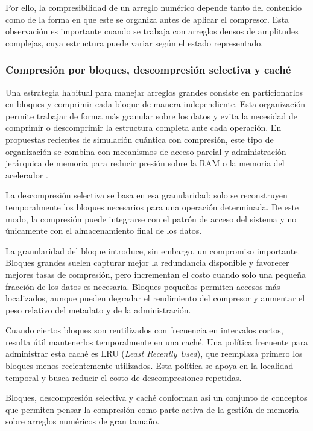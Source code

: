 Por ello, la compresibilidad de un arreglo numérico depende tanto del contenido como de la forma en que este se organiza antes de aplicar el compresor. Esta observación es importante cuando se trabaja con arreglos densos de amplitudes complejas, cuya estructura puede variar según el estado representado.

\subsubsection{Compresión por bloques, descompresión selectiva y caché}

Una estrategia habitual para manejar arreglos grandes consiste en particionarlos en bloques y comprimir cada bloque de manera independiente. Esta organización permite trabajar de forma más granular sobre los datos y evita la necesidad de comprimir o descomprimir la estructura completa ante cada operación. En propuestas recientes de simulación cuántica con compresión, este tipo de organización se combina con mecanismos de acceso parcial y administración jerárquica de memoria para reducir presión sobre la RAM o la memoria del acelerador \cite{wu2019full,zhang2024bmqsim}.

La descompresión selectiva se basa en esa granularidad: solo se reconstruyen temporalmente los bloques necesarios para una operación determinada. De este modo, la compresión puede integrarse con el patrón de acceso del sistema y no únicamente con el almacenamiento final de los datos.

La granularidad del bloque introduce, sin embargo, un compromiso importante. Bloques grandes suelen capturar mejor la redundancia disponible y favorecer mejores tasas de compresión, pero incrementan el costo cuando solo una pequeña fracción de los datos es necesaria. Bloques pequeños permiten accesos más localizados, aunque pueden degradar el rendimiento del compresor y aumentar el peso relativo del metadato y de la administración.

Cuando ciertos bloques son reutilizados con frecuencia en intervalos cortos, resulta útil mantenerlos temporalmente en una caché. Una política frecuente para administrar esta caché es LRU (\emph{Least Recently Used}), que reemplaza primero los bloques menos recientemente utilizados. Esta política se apoya en la localidad temporal y busca reducir el costo de descompresiones repetidas.

Bloques, descompresión selectiva y caché conforman así un conjunto de conceptos que permiten pensar la compresión como parte activa de la gestión de memoria sobre arreglos numéricos de gran tamaño.

